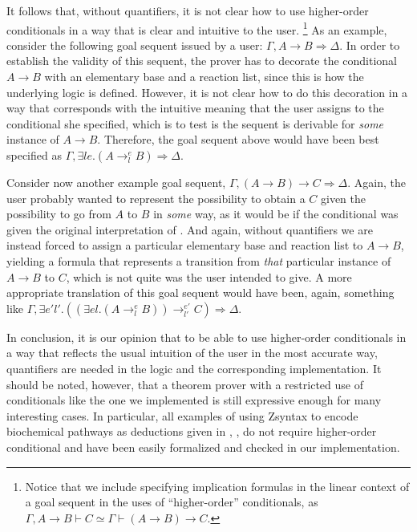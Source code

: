 It follows that, without quantifiers, it is not clear how to use higher-order
conditionals in a way that is clear and intuitive to the user.
\footnote{Notice that we include specifying implication formulas in the linear
  context of a goal sequent in the uses of ``higher-order'' conditionals, as
  $\Gamma, A \rightarrow B \vdash C \simeq \Gamma \vdash (A \rightarrow B)
  \rightarrow C$.}
As an example, consider the following goal sequent issued by a user: $\Gamma, A
\rightarrow B \Longrightarrow \Delta$. In order to establish the validity of
this sequent, the prover has to decorate the conditional $A \rightarrow B$ with
an elementary base and a reaction list, since this is how the underlying logic
is defined. However, it is not clear how to do this decoration in a way that
corresponds with the intuitive meaning that the user assigns to the
conditional she specified, which is to test is the sequent is derivable
for \emph{some} instance of $A \rightarrow B$.
Therefore, the goal sequent above would have been best specified as
$\Gamma, \exists l e . (A \rightarrow_l^e B) \Longrightarrow \Delta$.

Consider now another example goal sequent,
$\Gamma, (A \rightarrow B) \rightarrow C \Longrightarrow \Delta$.
Again, the user probably wanted to represent the possibility to obtain a $C$
given the possibility to go from $A$ to $B$ in \emph{some} way, as it would be
if the conditional was given the original interpretation of \cite{adding-logic}.
And again, without quantifiers we are instead forced to assign a particular
elementary base and reaction list to $A \rightarrow B$, yielding a formula that
represents a transition from \emph{that} particular instance of $A \rightarrow
B$ to $C$, which is not quite was the user intended to give.
A more appropriate translation of this goal sequent would have been, again,
something like
$\Gamma, \exists e' l' . ((\exists e l . (A \rightarrow_l^e B)) \rightarrow_{l'}^{e'} C) \Longrightarrow \Delta$.

In conclusion, it is our opinion that to be able to use higher-order
conditionals in a way that reflects the usual
intuition of the user in the most accurate way, quantifiers are needed in the
logic and the corresponding implementation.
It should be noted, however, that a theorem prover with a restricted use of
conditionals like the one we implemented is still expressive enough for many
interesting cases. In particular, all examples of using Zsyntax to encode
biochemical pathways as deductions given in \cite{2010paper},
\cite{adding-logic}, \cite{melanoma} do not require higher-order conditional and
have been easily formalized and checked in our implementation.

